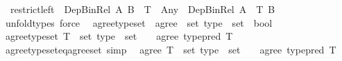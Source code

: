 \begin{isabellebody}
\ \ {\isachardoublequoteopen}restrict{\isacharunderscore}{\kern0pt}left\ {\isacharcolon}{\kern0pt}\ Dep{\isacharunderscore}{\kern0pt}Bin{\isacharunderscore}{\kern0pt}Rel\ A\ B\ {\isasymRightarrow}\ {\isacharparenleft}{\kern0pt}T\ {\isacharcolon}{\kern0pt}\ Any{\isacharparenright}{\kern0pt}\ {\isasymRightarrow}\ Dep{\isacharunderscore}{\kern0pt}Bin{\isacharunderscore}{\kern0pt}Rel\ {\isacharparenleft}{\kern0pt}A\ {\isacharampersand}{\kern0pt}\ T{\isacharparenright}{\kern0pt}\ B{\isachardoublequoteclose}\isanewline
\ \ \isanewline
%
\isadelimproof
\ \ %
\endisadelimproof
%
\isatagproof
{}\isamarkupfalse%
\ unfold{\isacharunderscore}{\kern0pt}types\ force%
\endisatagproof
{\isafoldproof}%
%
\isadelimproof
\isanewline
%
\endisadelimproof
\isanewline
{}\isamarkupfalse%
\isanewline
\ \ agree{\isacharunderscore}{\kern0pt}type{\isacharunderscore}{\kern0pt}set\ {\isasymequiv}\ {\isachardoublequoteopen}agree\ {\isacharcolon}{\kern0pt}{\isacharcolon}{\kern0pt}\ set\ type\ {\isasymRightarrow}\ set\ {\isasymRightarrow}\ bool{\isachardoublequoteclose}\isanewline
{}\isanewline
\ \ \isamarkupfalse%
\ {\isachardoublequoteopen}{\isacharparenleft}{\kern0pt}agree{\isacharunderscore}{\kern0pt}type{\isacharunderscore}{\kern0pt}set\ {\isacharparenleft}{\kern0pt}T\ {\isacharcolon}{\kern0pt}{\isacharcolon}{\kern0pt}\ set\ type{\isacharparenright}{\kern0pt}\ {\isacharcolon}{\kern0pt}{\isacharcolon}{\kern0pt}\ set\ {\isasymRightarrow}\ {\isacharunderscore}{\kern0pt}{\isacharparenright}{\kern0pt}\ {\isasymequiv}\ agree\ {\isacharparenleft}{\kern0pt}type{\isacharunderscore}{\kern0pt}pred\ T{\isacharparenright}{\kern0pt}{\isachardoublequoteclose}\isanewline
{}\isamarkupfalse%
\isanewline
\isanewline
{}\isamarkupfalse%
\ agree{\isacharunderscore}{\kern0pt}type{\isacharunderscore}{\kern0pt}set{\isacharunderscore}{\kern0pt}eq{\isacharunderscore}{\kern0pt}agree{\isacharunderscore}{\kern0pt}set\ {\isacharbrackleft}{\kern0pt}simp{\isacharbrackright}{\kern0pt}{\isacharcolon}{\kern0pt}\isanewline
\ \ {\isachardoublequoteopen}{\isacharparenleft}{\kern0pt}agree\ {\isacharparenleft}{\kern0pt}T\ {\isacharcolon}{\kern0pt}{\isacharcolon}{\kern0pt}\ set\ type{\isacharparenright}{\kern0pt}\ {\isacharcolon}{\kern0pt}{\isacharcolon}{\kern0pt}\ set\ {\isasymRightarrow}\ {\isacharunderscore}{\kern0pt}{\isacharparenright}{\kern0pt}\ {\isacharequal}{\kern0pt}\ agree\ {\isacharparenleft}{\kern0pt}type{\isacharunderscore}{\kern0pt}pred\ T{\isacharparenright}{\kern0pt}{\isachardoublequoteclose}\isanewline

\end{isabellebody}
